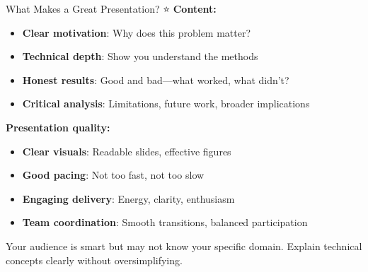 \documentclass[aspectratio=169]{beamer}
\begin{document}
\begin{frame}[shrink=10]{What Makes a Great Presentation? ⭐}
\small
\textbf{Content:}
\begin{itemize}\setlength{\itemsep}{0pt}
    \item \textbf{Clear motivation}: Why does this problem matter?
    \item \textbf{Technical depth}: Show you understand the methods
    \item \textbf{Honest results}: Good and bad—what worked, what didn't?
    \item \textbf{Critical analysis}: Limitations, future work, broader implications
\end{itemize}

\vspace{0.3cm}

\textbf{Presentation quality:}
\begin{itemize}\setlength{\itemsep}{0pt}
    \item \textbf{Clear visuals}: Readable slides, effective figures
    \item \textbf{Good pacing}: Not too fast, not too slow
    \item \textbf{Engaging delivery}: Energy, clarity, enthusiasm
    \item \textbf{Team coordination}: Smooth transitions, balanced participation
\end{itemize}

\vspace{0.3cm}

\begin{thinkaboutit}
Your audience is smart but may not know your specific domain. Explain technical concepts clearly without oversimplifying.
\end{thinkaboutit}
\end{frame}
\end{document}

